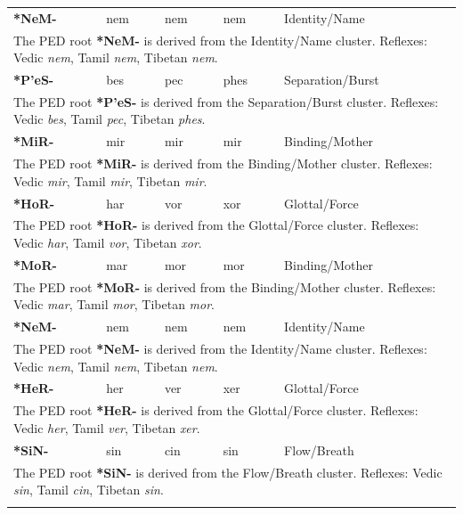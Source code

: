 \begin{longtable}{p{} p{} p{} p{} p{}}
\textbf{*NeM-} & nem & nem & nem & Identity/Name \\ 
\multicolumn{5}{p{\textwidth}}{\small The PED root \textbf{*NeM-} is derived from the Identity/Name cluster. Reflexes: Vedic \textit{nem}, Tamil \textit{nem}, Tibetan \textit{nem}. } \\ \addlinespace 
\textbf{*P'eS-} & bes & pec & phes & Separation/Burst \\ 
\multicolumn{5}{p{\textwidth}}{\small The PED root \textbf{*P'eS-} is derived from the Separation/Burst cluster. Reflexes: Vedic \textit{bes}, Tamil \textit{pec}, Tibetan \textit{phes}. } \\ \addlinespace 
\textbf{*MiR-} & mir & mir & mir & Binding/Mother \\ 
\multicolumn{5}{p{\textwidth}}{\small The PED root \textbf{*MiR-} is derived from the Binding/Mother cluster. Reflexes: Vedic \textit{mir}, Tamil \textit{mir}, Tibetan \textit{mir}. } \\ \addlinespace 
\textbf{*HoR-} & har & vor & xor & Glottal/Force \\ 
\multicolumn{5}{p{\textwidth}}{\small The PED root \textbf{*HoR-} is derived from the Glottal/Force cluster. Reflexes: Vedic \textit{har}, Tamil \textit{vor}, Tibetan \textit{xor}. } \\ \addlinespace 
\textbf{*MoR-} & mar & mor & mor & Binding/Mother \\ 
\multicolumn{5}{p{\textwidth}}{\small The PED root \textbf{*MoR-} is derived from the Binding/Mother cluster. Reflexes: Vedic \textit{mar}, Tamil \textit{mor}, Tibetan \textit{mor}. } \\ \addlinespace 
\textbf{*NeM-} & nem & nem & nem & Identity/Name \\ 
\multicolumn{5}{p{\textwidth}}{\small The PED root \textbf{*NeM-} is derived from the Identity/Name cluster. Reflexes: Vedic \textit{nem}, Tamil \textit{nem}, Tibetan \textit{nem}. } \\ \addlinespace 
\textbf{*HeR-} & her & ver & xer & Glottal/Force \\ 
\multicolumn{5}{p{\textwidth}}{\small The PED root \textbf{*HeR-} is derived from the Glottal/Force cluster. Reflexes: Vedic \textit{her}, Tamil \textit{ver}, Tibetan \textit{xer}. } \\ \addlinespace 
\textbf{*SiN-} & sin & cin & sin & Flow/Breath \\ 
\multicolumn{5}{p{\textwidth}}{\small The PED root \textbf{*SiN-} is derived from the Flow/Breath cluster. Reflexes: Vedic \textit{sin}, Tamil \textit{cin}, Tibetan \textit{sin}. } \\ \addlinespace 

\end{longtable}
